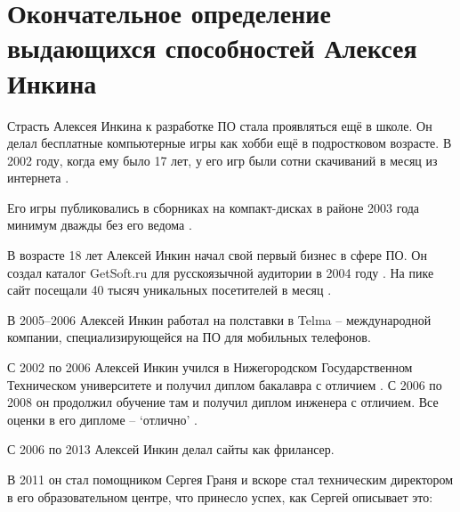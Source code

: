 \section{Окончательное определение выдающихся способностей Алексея Инкина}
\label{sec:Merits}

Страсть Алексея Инкина к разработке ПО стала проявляться ещё в школе.
Он делал бесплатные компьютерные игры как хобби ещё в подростковом возрасте.
В 2002 году, когда ему было 17 лет, у его игр были сотни скачиваний в месяц из интернета
.

Его игры публиковались в сборниках на компакт-дисках в районе 2003 года минимум дважды
без его ведома .

В возрасте 18 лет Алексей Инкин начал свой первый бизнес в сфере ПО.
Он создал каталог GetSoft.ru для русскоязычной аудитории в 2004 году .
На пике сайт посещали 40 тысяч уникальных посетителей в месяц .

В 2005--2006 Алексей Инкин работал на полставки в Telma -- международной компании,
специализирующейся на ПО для мобильных телефонов.

С 2002 по 2006 Алексей Инкин учился в Нижегородском Государственном Техническом университете и получил диплом бакалавра с отличием .
С 2006 по 2008 он продолжил обучение там и получил диплом инженера с отличием.
Все оценки в его дипломе -- `отлично' .

С 2006 по 2013 Алексей Инкин делал сайты как фрилансер.

В 2011 он стал помощником Сергея Граня и вскоре стал техническим директором
в его образовательном центре, что принесло успех, как Сергей описывает это:


